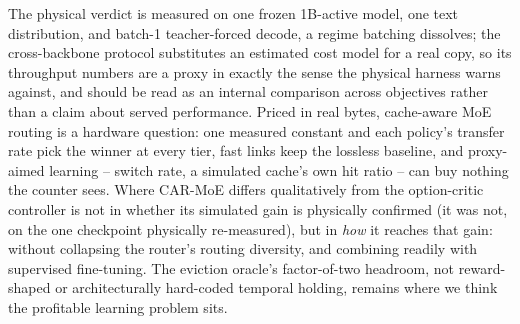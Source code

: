 \documentclass{article}
\begin{document}
The physical verdict is measured on one frozen 1B-active model, one text distribution, and
batch-1 teacher-forced decode, a regime batching dissolves; the cross-backbone protocol
substitutes an estimated cost model for a real copy, so its throughput numbers are a proxy in
exactly the sense the physical harness warns against, and should be read as an internal
comparison across objectives rather than a claim about served performance. Priced in real
bytes, cache-aware MoE routing is a hardware question: one measured constant and each
policy's transfer rate pick the winner at every tier, fast links keep the lossless baseline,
and proxy-aimed learning -- switch rate, a simulated cache's own hit ratio -- can buy nothing
the counter sees. Where CAR-MoE differs qualitatively from the option-critic controller is
not in whether its simulated gain is physically confirmed (it was not, on the one checkpoint
physically re-measured), but in \emph{how} it reaches that gain: without collapsing the
router's routing diversity, and combining readily with supervised fine-tuning. The eviction
oracle's factor-of-two headroom, not reward-shaped or architecturally hard-coded temporal
holding, remains where we think the profitable learning problem sits.
\end{document}
